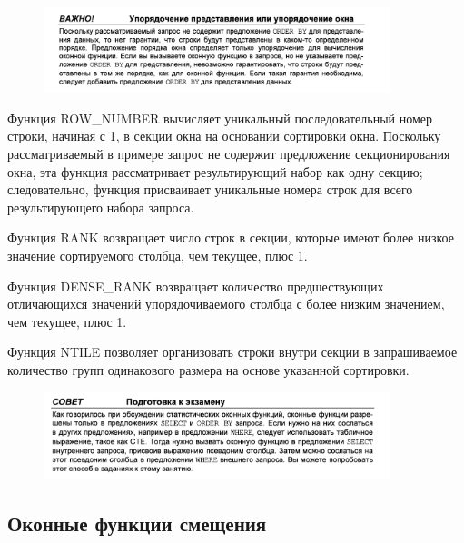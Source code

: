 \begin{figure}[h!]
	\begin{center}
		\includegraphics[width=0.9\textwidth]{img/warn3.png}
	\end{center}
	\captionsetup{justification=centering}
\end{figure}


Функция ROW\_NUMBER вычисляет уникальный последовательный номер строки, начиная с 1, в секции окна на основании сортировки окна. Поскольку рассматриваемый
в примере запрос не содержит предложение секционирования окна, эта функция
рассматривает результирующий набор как одну секцию; следовательно, функция
присваивает уникальные номера строк для всего результирующего набора запроса. 

Функция RANK возвращает число строк в секции,
которые имеют более низкое значение сортируемого столбца, чем текущее, плюс 1. 

Функция DENSE\_RANK возвращает количество предшествующих отличающихся значений упорядочиваемого столбца с более низким значением, чем текущее, плюс 1. 

Функция NTILE позволяет организовать строки внутри секции в запрашиваемое количество групп одинакового размера на основе указанной сортировки.

\begin{figure}[h!]
	\begin{center}
		\includegraphics[width=0.9\textwidth]{img/advice10.png}
	\end{center}
	\captionsetup{justification=centering}
\end{figure}


\subsection{Оконные функции смещения}

